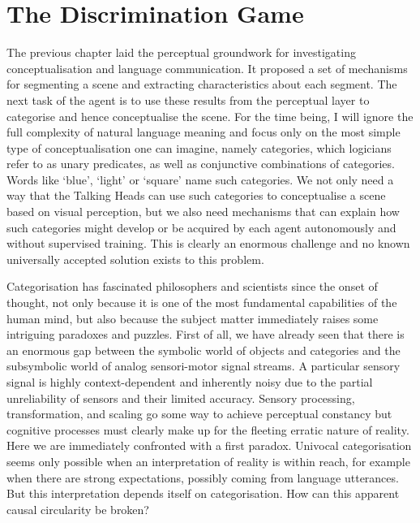 \chapter{The Discrimination Game}
\label{chap:4}

The previous chapter laid the perceptual groundwork 
for investigating conceptualisation and language 
communication. It proposed a set of mechanisms for segmenting a 
scene and extracting characteristics about each 
segment. The next task of the agent is to use these results
from the perceptual layer to categorise 
and hence conceptualise the
scene. For the time being, I will 
ignore the full complexity of natural
language meaning and focus only on the most 
simple type of conceptualisation one can
imagine, namely categories, which logicians refer 
to as unary predicates, as well as conjunctive 
combinations of categories. Words like `blue', `light' or
`square' name such categories. We not only need a way 
that the Talking Heads can use such categories to conceptualise
a scene based on visual perception, but we also need 
mechanisms that can explain how such categories might 
develop or be acquired by each agent autonomously and 
without supervised training. This is clearly an enormous
challenge and no known universally accepted solution 
exists to this problem.

Categorisation has fascinated philosophers and scientists
since the onset  of thought, not only because it is one
of the most fundamental capabilities of the human mind, 
but also because the subject matter immediately raises 
some intriguing paradoxes and puzzles. First of all, 
we have already seen that there is an enormous 
gap between the symbolic world of objects and categories
and the subsymbolic world of analog sensori-motor signal streams. 
A particular sensory signal is highly context-dependent and
inherently noisy due to the partial
unreliability of sensors and their limited accuracy. 
Sensory processing, transformation, and scaling 
go some way to achieve perceptual constancy
but cognitive processes must clearly make up for
the fleeting erratic nature of reality. 
Here we are immediately confronted with a first paradox. 
Univocal categorisation seems only possible when 
an interpretation of reality is within reach, for example
when there are strong expectations, possibly coming 
from language utterances. But this interpretation
depends itself on categorisation. How can this apparent
causal circularity be broken? 

